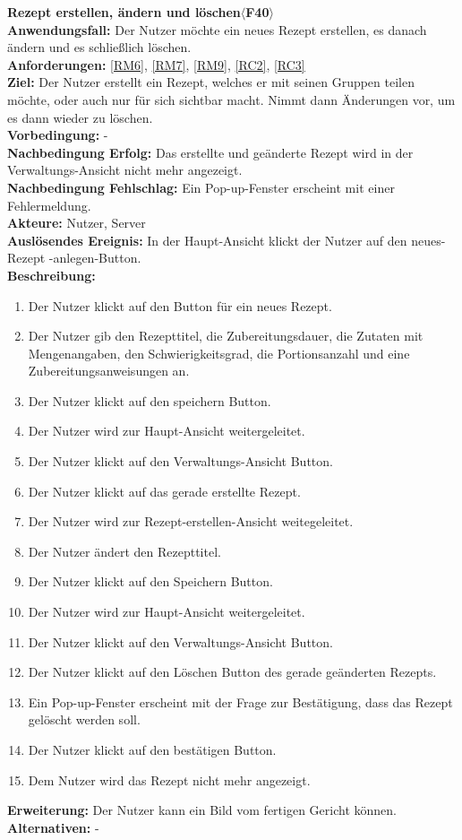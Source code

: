 \documentclass[parskip=full]{scrartcl}
\begin{document}
\textbf{Rezept erstellen, ändern und löschen$\langle$F40$\rangle$}\\
\textbf{Anwendungsfall:} Der Nutzer möchte ein neues Rezept erstellen, es danach ändern und es schließlich löschen.\\
\textbf{Anforderungen:} \ref{RM6}, \ref{RM7}, \ref{RM9}, \ref{RC2}, \ref{RC3}\\
\textbf{Ziel:} Der Nutzer erstellt ein Rezept, welches er mit seinen Gruppen teilen möchte, oder auch nur für sich sichtbar macht. Nimmt dann Änderungen vor, um es dann wieder zu löschen.\\
\textbf{Vorbedingung:} -\\
\textbf{Nachbedingung Erfolg:} Das erstellte und geänderte Rezept wird in der Verwaltungs-Ansicht nicht mehr angezeigt.  \\
\textbf{Nachbedingung Fehlschlag:} Ein Pop-up-Fenster erscheint mit einer Fehlermeldung.\\
\textbf{Akteure:} Nutzer, Server\\
\textbf{Auslösendes Ereignis:} In der Haupt-Ansicht klickt der Nutzer auf den neues-Rezept -anlegen-Button.\\
\textbf{Beschreibung:}
\begin{enumerate}
    \item Der Nutzer klickt auf den Button für ein neues Rezept.
    \item Der Nutzer gib den Rezepttitel, die Zubereitungsdauer, die Zutaten mit Mengenangaben, den Schwierigkeitsgrad, die Portionsanzahl und eine Zubereitungsanweisungen an.
    \item Der Nutzer klickt auf den speichern Button.
    \item Der Nutzer wird zur Haupt-Ansicht weitergeleitet.
    \item Der Nutzer klickt auf den Verwaltungs-Ansicht Button.
    \item Der Nutzer klickt auf das gerade erstellte Rezept.
    \item Der Nutzer wird zur Rezept-erstellen-Ansicht weitegeleitet.
    \item Der Nutzer ändert den Rezepttitel.
    \item Der Nutzer klickt auf den Speichern Button.
    \item Der Nutzer wird zur Haupt-Ansicht weitergeleitet. 
    \item Der Nutzer klickt auf den Verwaltungs-Ansicht Button.
    \item Der Nutzer klickt auf den Löschen Button des gerade geänderten Rezepts.
    \item Ein Pop-up-Fenster erscheint mit der Frage zur Bestätigung, dass das Rezept gelöscht werden soll.
    \item Der Nutzer klickt auf den bestätigen Button.
    \item Dem Nutzer wird das Rezept nicht mehr angezeigt.
\end{enumerate}
\textbf{Erweiterung:} Der Nutzer kann ein Bild vom fertigen Gericht können.\\
\textbf{Alternativen:} -\\
\newpage
\end{document}
